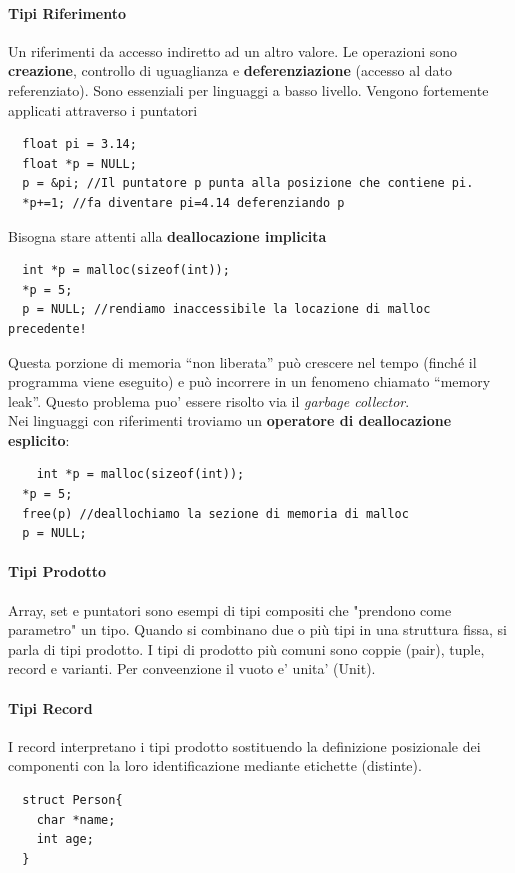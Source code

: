 \documentclass[a4paper,12pt]{article}
\begin{document}
\paragraph{Tipi Riferimento}
Un riferimenti da accesso indiretto ad un altro valore. Le operazioni sono \textbf{creazione}, controllo di uguaglianza e \textbf{deferenziazione} (accesso al dato referenziato). Sono essenziali per linguaggi a basso livello. Vengono fortemente applicati attraverso i puntatori
\begin{lstlisting}
  float pi = 3.14;
  float *p = NULL;
  p = &pi; //Il puntatore p punta alla posizione che contiene pi.
  *p+=1; //fa diventare pi=4.14 deferenziando p
\end{lstlisting}
Bisogna stare attenti alla \textbf{deallocazione implicita}
\begin{lstlisting}
  int *p = malloc(sizeof(int));
  *p = 5; 
  p = NULL; //rendiamo inaccessibile la locazione di malloc precedente!
\end{lstlisting}
Questa porzione di memoria “non liberata” può crescere nel
tempo (finché il programma viene eseguito) e può incorrere
in un fenomeno chiamato “memory leak”. Questo problema puo' essere risolto via il \textit{garbage collector}.\\
Nei linguaggi con riferimenti troviamo un \textbf{operatore di deallocazione esplicito}:
\begin{lstlisting}
    int *p = malloc(sizeof(int));
  *p = 5; 
  free(p) //deallochiamo la sezione di memoria di malloc
  p = NULL;
\end{lstlisting}
\paragraph{Tipi Prodotto}
Array, set e puntatori sono esempi di tipi compositi che "prendono come parametro" un tipo. Quando si combinano due o più tipi in una struttura fissa, si parla di tipi
prodotto. I tipi di prodotto più comuni sono coppie (pair), tuple, record e varianti. Per conveenzione il vuoto e' unita' (Unit).
\paragraph{Tipi Record}
I record interpretano i tipi prodotto sostituendo la definizione posizionale dei
componenti con la loro identificazione mediante etichette (distinte).
\begin{lstlisting}
  struct Person{
    char *name;
    int age;
  }
\end{lstlisting}
\end{document}
